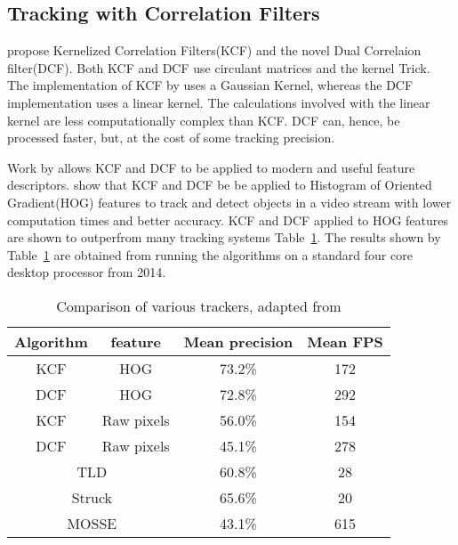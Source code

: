 \subsection{Tracking with Correlation Filters}
\citeauthor{Enriques2014} \cite{Enriques2014} propose Kernelized Correlation Filters(KCF) and the novel Dual Correlaion filter(DCF).
Both KCF and DCF use circulant matrices and the kernel Trick.
The implementation of KCF by \citeauthor{Enriques2014} uses a Gaussian Kernel, whereas the DCF implementation uses a linear kernel.
The calculations involved with the linear kernel are less computationally complex than KCF. 
DCF can, hence, be processed faster, but, at the cost of some tracking precision.

Work by \citeauthor{multichannelCorrFilters} \cite{multichannelCorrFilters} allows KCF and DCF to be applied to modern and useful feature descriptors.
\citeauthor{Enriques2014} show that KCF and DCF be be applied to Histogram of Oriented Gradient(HOG) features to track and detect objects in a video stream with lower computation times and better accuracy.
KCF and DCF applied to HOG features are shown to outperfrom many tracking systems Table~\ref{tab:trackers}.
The results shown by Table~\ref{tab:trackers} are obtained from running the algorithms on a standard four core desktop processor from 2014.

\begin{table}
  \centering
  \begin{tabular}[t]{cccc}
    \toprule
    Algorithm & feature & Mean precision & Mean FPS \\
    \midrule
    KCF       & HOG     & 73.2\%         & 172      \\
    \hline
    DCF       & HOG     & 72.8\%         & 292      \\
    \hline
    KCF       & Raw pixels & 56.0\%      & 154      \\
    \hline
    DCF       & Raw pixels & 45.1\%      & 278      \\
    \midrule
    \midrule
    \multicolumn{2}{c}{TLD}   & 60.8\%      &  28      \\
    \hline
    \multicolumn{2}{c}{Struck\cite{struck}}& 65.6\%     &  20     \\
    \hline
    \multicolumn{2}{c}{MOSSE\cite{mosse}}& 43.1\%      &  615     \\
    \bottomrule
  \end{tabular}
  \caption{Comparison of various trackers, adapted from \cite{Enriques2014}}
  \label{tab:trackers}
\end{table}

